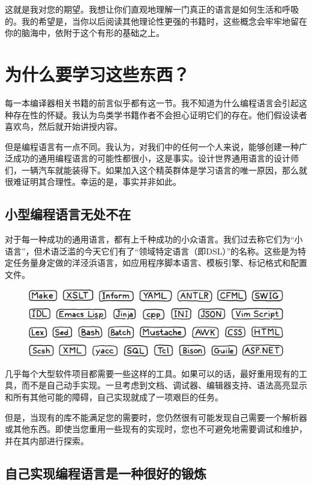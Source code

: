 \documentclass[cn,11pt,chinese]{elegantbook}
\begin{document}
这就是我对您的期望。我想让你们直观地理解一门真正的语言是如何生活和呼吸的。我的希望是，当你以后阅读其他理论性更强的书籍时，这些概念会牢牢地留在你的脑海中，依附于这个有形的基础之上。

\section{为什么要学习这些东西？}

每一本编译器相关书籍的前言似乎都有这一节。我不知道为什么编程语言会引起这种存在性的怀疑。我认为鸟类学书籍作者不会担心证明它们的存在。他们假设读者喜欢鸟，然后就开始讲授内容。

但是编程语言有一点不同。我认为，对我们中的任何一个人来说，能够创建一种广泛成功的通用编程语言的可能性都很小，这是事实。设计世界通用语言的设计师们，一辆汽车就能装得下。如果加入这个精英群体是学习语言的唯一原因，那么就很难证明其合理性。幸运的是，事实并非如此。

\subsection{小型编程语言无处不在}

对于每一种成功的通用语言，都有上千种成功的小众语言。我们过去称它们为“小语言”，但术语泛滥的今天它们有了“领域特定语言（即DSL）”的名称。这些是为特定任务量身定做的洋泾浜语言，如应用程序脚本语言、模板引擎、标记格式和配置文件。

\begin{figure}[htbp]
  \centering
  \includegraphics[width=\textwidth]{image/introduction/little-languages.png}
\end{figure}

几乎每个大型软件项目都需要一些这样的工具。如果可以的话，最好重用现有的工具，而不是自己动手实现。一旦考虑到文档、调试器、编辑器支持、语法高亮显示和所有其他可能的障碍，自己实现就成了一项艰巨的任务。

但是，当现有的库不能满足您的需要时，您仍然很有可能发现自己需要一个解析器或其他东西。即使当您重用一些现有的实现时，您也不可避免地需要调试和维护，并在其内部进行探索。

\subsection{自己实现编程语言是一种很好的锻炼}
\end{document}
